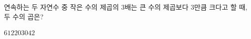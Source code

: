 연속하는 두 자연수 중 작은 수의 제곱의 $3$배는 큰 수의 제곱보다 $3$만큼 크다고 할 때, 두 수의 곱은?
\begin{choices32}{$6$}{$12$}{$20$}{$30$}{$42$}\end{choices32}
